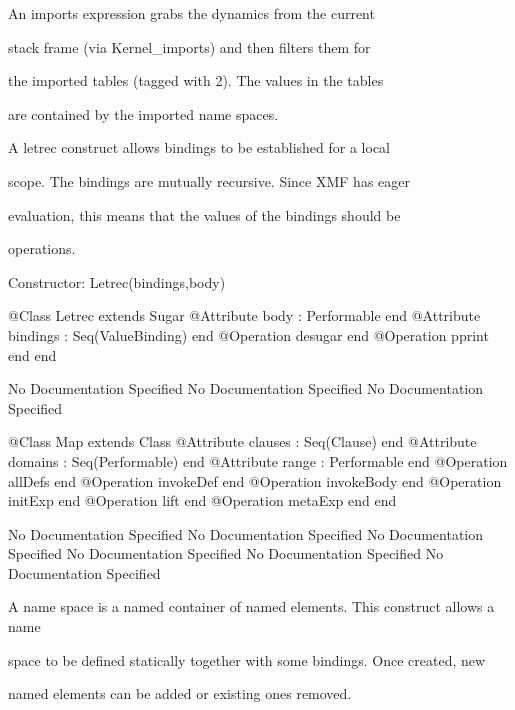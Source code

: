         An imports expression grabs the dynamics from the current

        stack frame (via Kernel_imports) and then filters them for

        the imported tables (tagged with 2). The values in the tables

        are contained by the imported name spaces.

      A letrec construct allows bindings to be established for a local

      scope. The bindings are mutually recursive. Since XMF has eager

      evaluation, this means that the values of the bindings should be

      operations.
     
      Constructor: Letrec(bindings,body)
\begin{Interface}
@Class Letrec extends Sugar
  @Attribute body : Performable end
  @Attribute bindings : Seq(ValueBinding) end
  @Operation desugar end
  @Operation pprint end
end
\end{Interface}
No Documentation Specified
No Documentation Specified
No Documentation Specified
\begin{Interface}
@Class Map extends Class
  @Attribute clauses : Seq(Clause) end
  @Attribute domains : Seq(Performable) end
  @Attribute range : Performable end
  @Operation allDefs end
  @Operation invokeDef end
  @Operation invokeBody end
  @Operation initExp end
  @Operation lift end
  @Operation metaExp end
end
\end{Interface}
No Documentation Specified
No Documentation Specified
No Documentation Specified
No Documentation Specified
No Documentation Specified
No Documentation Specified

       A name space is a named container of named elements. This construct allows a name

       space to be defined statically together with some bindings. Once created, new

       named elements can be added or existing ones removed.
     

